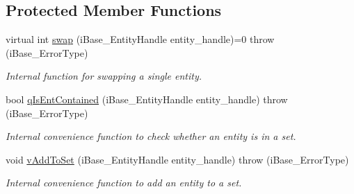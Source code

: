\subsection*{Protected Member Functions}
\begin{DoxyCompactItemize}
\item 
\hypertarget{class_i_t_a_p_s___swap_1_1_swap_a4a68c5ddcc730223474184c388f59877}{
virtual int \hyperlink{class_i_t_a_p_s___swap_1_1_swap_a4a68c5ddcc730223474184c388f59877}{swap} (iBase\_\-EntityHandle entity\_\-handle)=0  throw (iBase\_\-ErrorType)}
\label{class_i_t_a_p_s___swap_1_1_swap_a4a68c5ddcc730223474184c388f59877}

\begin{DoxyCompactList}\small\item\em Internal function for swapping a single entity. \item\end{DoxyCompactList}\item 
\hypertarget{class_i_t_a_p_s___swap_1_1_swap_a221c0d60ad88953d9347e0d3558864b6}{
bool \hyperlink{class_i_t_a_p_s___swap_1_1_swap_a221c0d60ad88953d9347e0d3558864b6}{qIsEntContained} (iBase\_\-EntityHandle entity\_\-handle)  throw (iBase\_\-ErrorType)}
\label{class_i_t_a_p_s___swap_1_1_swap_a221c0d60ad88953d9347e0d3558864b6}

\begin{DoxyCompactList}\small\item\em Internal convenience function to check whether an entity is in a set. \item\end{DoxyCompactList}\item 
\hypertarget{class_i_t_a_p_s___swap_1_1_swap_ab5651c14ff282a14410932ed94fafbb2}{
void \hyperlink{class_i_t_a_p_s___swap_1_1_swap_ab5651c14ff282a14410932ed94fafbb2}{vAddToSet} (iBase\_\-EntityHandle entity\_\-handle)  throw (iBase\_\-ErrorType)}
\label{class_i_t_a_p_s___swap_1_1_swap_ab5651c14ff282a14410932ed94fafbb2}

\begin{DoxyCompactList}\small\item\em Internal convenience function to add an entity to a set. \item\end{DoxyCompactList}\end{DoxyCompactItemize}
